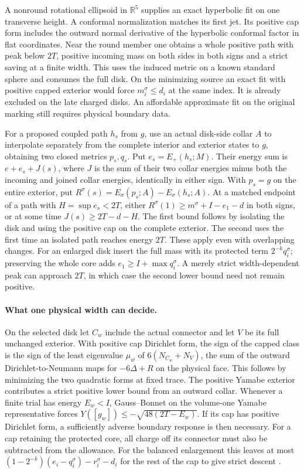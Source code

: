 \documentclass[11pt,letterpaper]{article}
\numberwithin{equation}{section}
\newcommand{\R}{\mathbb R}
\begin{document}
A nonround rotational ellipsoid in \(\R^5\) supplies an exact
hyperbolic fit on one transverse height. A conformal normalization
matches its first jet. Its positive cap form includes the outward
normal derivative of the hyperbolic conformal factor in flat
coordinates. Near the round member one obtains a whole positive path
with peak below \(2T\), positive incoming mass on both sides in both
signs and a strict saving at a finite width. This uses the induced
metric on a known standard sphere and consumes the full disk.
On the minimizing source an exact fit with positive capped exterior
would force \(m_i^\sigma\le d_i\) at the same index. It is already
excluded on the late charged disks. An affordable approximate fit
on the original marking still requires physical boundary data.

For a proposed coupled path \(h_s\) from \(g\), use an actual
disk-side collar \(A\) to interpolate separately from the complete
interior and exterior states to \(g\), obtaining two closed metrics
\(p_s,q_s\). Put \(e_s=E_+(h_s;M)\). Their energy sum is
\(e+e_s+J(s)\), where \(J\) is the sum of their two collar energies
minus both the incoming and joined collar energies, identically in
either sign. With \(p_s=g\) on the entire exterior, put
\(R^\sigma(s)=E_\sigma(p_s;A)-E_\sigma(h_s;A)\).
At a matched endpoint of a path with \(H=\sup e_s<2T\),
either \(R^\sigma(1)\ge m^\sigma+I-e_1-d\) in both signs, or at
some time \(J(s)\ge2T-d-H\). The first bound follows by isolating
the disk and using the positive cap on the complete exterior. The
second uses the first time an isolated path reaches energy \(2T\). These apply even with overlapping changes. For an
enlarged disk insert the full mass with its protected term
\(2^{-k}q_i^\sigma\); preserving the whole core adds
\(e_1\ge I+\max q_i^\sigma\). A merely strict width-dependent
peak can approach \(2T\), in which case the second lower bound
need not remain positive.


\paragraph{What one physical width can decide.}
On the selected disk let \(C_w\) include the actual connector and
let \(V\) be its full unchanged exterior. With positive cap
Dirichlet form, the sign of the capped class is the sign of the
least eigenvalue \(\mu_w\) of \(6(N_{C_w}+N_V)\), the sum of the
outward Dirichlet-to-Neumann maps for \(-6\Delta+R\) on the
physical face. This follows by minimizing the two quadratic
forms at fixed trace. The positive Yamabe exterior contributes a
strict positive lower bound from an outward collar.
Whenever a finite trial has energy \(E_w<I\), Gauss--Bonnet on
the volume-one Yamabe representative forces
\(Y([g_w])\le-\sqrt{48(2T-E_w)}\). If its cap has positive
Dirichlet form, a sufficiently adverse boundary response is then
necessary. For a cap retaining the protected core, all charge
off its connector must also be subtracted from the allowance.
For the balanced enlargement this leaves at most
\((1-2^{-k})(e_i-q_i^\sigma)-r_i^\sigma-d_i\)
for the rest of the cap to give strict descent
\cite{Baker2026CollarDeformation}.
\end{document}
